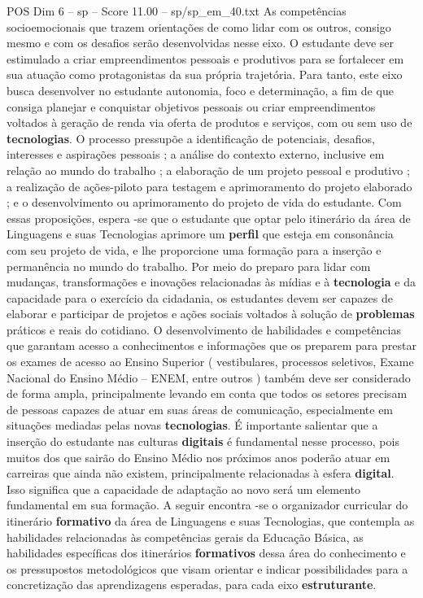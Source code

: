 \begin{textsample}{POS Dim 6 – sp – Score 11.00 – sp/sp\_em\_40.txt}
As competências socioemocionais que trazem orientações de como lidar com os outros, consigo mesmo e com os desafios serão desenvolvidas nesse eixo.
O estudante deve ser estimulado a criar empreendimentos pessoais e produtivos para se fortalecer em sua atuação como protagonistas da sua própria trajetória.
Para tanto, este eixo busca desenvolver no estudante autonomia, foco e determinação, a fim de que consiga planejar e conquistar objetivos pessoais ou criar empreendimentos voltados à geração de renda via oferta de produtos e serviços, com ou sem uso de \textbf{tecnologias}.
O processo pressupõe a identificação de potenciais, desafios, interesses e aspirações pessoais ; a análise do contexto externo, inclusive em relação ao mundo do trabalho ; a elaboração de um projeto pessoal e produtivo ; a realização de ações-piloto para testagem e aprimoramento do projeto elaborado ; e o desenvolvimento ou aprimoramento do projeto de vida do estudante.
Com essas proposições, espera -se que o estudante que optar pelo itinerário da área de Linguagens e suas Tecnologias aprimore um \textbf{perfil} que esteja em consonância com seu projeto de vida, e lhe proporcione uma formação para a inserção e permanência no mundo do trabalho.
Por meio do preparo para lidar com mudanças, transformações e inovações relacionadas às mídias e à \textbf{tecnologia} e da capacidade para o exercício da cidadania, os estudantes devem ser capazes de elaborar e participar de projetos e ações sociais voltados à solução de \textbf{problemas} práticos e reais do cotidiano.
O desenvolvimento de habilidades e competências que garantam acesso a conhecimentos e informações que os preparem para prestar os exames de acesso ao Ensino Superior ( vestibulares, processos seletivos, Exame Nacional do Ensino Médio – ENEM, entre outros ) também deve ser considerado de forma ampla, principalmente levando em conta que todos os setores precisam de pessoas capazes de atuar em suas áreas de comunicação, especialmente em situações mediadas pelas novas \textbf{tecnologias}.
É importante salientar que a inserção do estudante nas culturas \textbf{digitais} é fundamental nesse processo, pois muitos dos que sairão do Ensino Médio nos próximos anos poderão atuar em carreiras que ainda não existem, principalmente relacionadas à esfera \textbf{digital}.
Isso significa que a capacidade de adaptação ao novo será um elemento fundamental em sua formação.
A seguir encontra -se o organizador curricular do itinerário \textbf{formativo} da área de Linguagens e suas Tecnologias, que contempla as habilidades relacionadas às competências gerais da Educação Básica, as habilidades específicas dos itinerários \textbf{formativos} dessa área do conhecimento e os pressupostos metodológicos que visam orientar e indicar possibilidades para a concretização das aprendizagens esperadas, para cada eixo \textbf{estruturante}.

\end{textsample}
